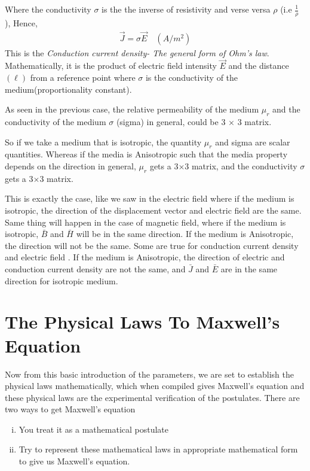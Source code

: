 Where the conductivity $ \sigma $ is the the inverse of resistivity and verse versa $ \rho $  (i.e $ \frac{1}{\rho} $ ), Hence, 
\begin{align}
\boxed{\vec{J} = \sigma \vec{E}}\quad (A/m^{2})
\end{align}
This is the \emph{Conduction current density- The general form of Ohm's law}. Mathematically, it is the product of electric field intensity $\vec{E}$ and the distance$(\ell)$ from a reference point where $\sigma$ is the conductivity of the medium(proportionality constant).

As seen in the previous case, the relative permeability of the medium $ \mu_r $ and the conductivity of the medium $ \sigma $ (sigma) in general, could be 3 $ \times $ 3 matrix.

So if we take a medium that is isotropic, the quantity $ \mu_r$ and sigma are scalar quantities. Whereas if the media is Anisotropic such that the media property depends on the direction in general, $ \mu_r $ gets a 3$ \times $3 matrix,  and the conductivity $ \sigma $ gets a 3$ \times $3 matrix.

This is exactly the case, like we saw in the electric field where if the medium is isotropic, the direction of the displacement vector and electric field are the same. Same thing will happen in the case of magnetic field, where if the medium is isotropic, $ \bar{B}$ and $ \bar{H}$ will be in the same direction. If the medium is Anisotropic, the direction will not be the same. Some are true for conduction current density and electric field . If the medium is Anisotropic, the direction of electric and conduction current density are not the same, and $ \bar{J} $ and $\bar{E}$ are in the same direction  for isotropic medium. 

\section{The Physical Laws To Maxwell's Equation}
Now from this basic introduction of the parameters, we are set to establish the physical laws mathematically, which when compiled gives Maxwell's equation and these physical laws are the experimental verification of the postulates. There are two ways to get Maxwell's equation
\begin{enumerate}[(i)]
\item You treat it as a mathematical postulate
\item Try to represent these mathematical laws in appropriate mathematical form to give us Maxwell's equation.
\end{enumerate}

